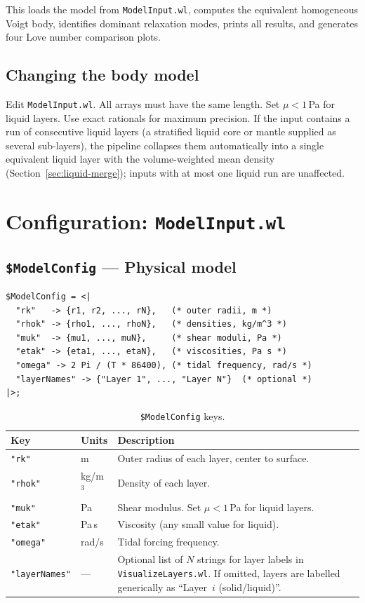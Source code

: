 \documentclass[11pt]{article}
\begin{document}
This loads the model from \texttt{ModelInput.wl}, computes the
equivalent homogeneous Voigt body, identifies dominant relaxation
modes, prints all results, and generates four Love number comparison
plots.

\subsection{Changing the body model}

Edit \texttt{ModelInput.wl}.  All arrays must have the same length.
Set $\mu < 1$\,Pa for liquid layers.  Use exact rationals for maximum
precision.  If the input contains a run of consecutive liquid
layers (a stratified liquid core or mantle supplied as several
sub-layers), the pipeline collapses them automatically into a
single equivalent liquid layer with the volume-weighted mean
density (Section~\ref{sec:liquid-merge}); inputs with at most one
liquid run are unaffected.

\section{Configuration: \texttt{ModelInput.wl}}
\label{sec:config}

\subsection{\texttt{\$ModelConfig} --- Physical model}

\begin{lstlisting}
$ModelConfig = <|
  "rk"   -> {r1, r2, ..., rN},   (* outer radii, m *)
  "rhok" -> {rho1, ..., rhoN},   (* densities, kg/m^3 *)
  "muk"  -> {mu1, ..., muN},     (* shear moduli, Pa *)
  "etak" -> {eta1, ..., etaN},   (* viscosities, Pa s *)
  "omega" -> 2 Pi / (T * 86400), (* tidal frequency, rad/s *)
  "layerNames" -> {"Layer 1", ..., "Layer N"}  (* optional *)
|>;
\end{lstlisting}

\begin{table}[h]
\centering
\begin{tabular}{@{}llp{7cm}@{}}
\toprule
\textbf{Key} & \textbf{Units} & \textbf{Description} \\
\midrule
\texttt{"rk"}    & m      & Outer radius of each layer, center to
  surface. \\
\texttt{"rhok"}  & kg/m$^3$ & Density of each layer. \\
\texttt{"muk"}   & Pa     & Shear modulus.  Set $\mu < 1$\,Pa for
  liquid layers. \\
\texttt{"etak"}  & Pa\,s  & Viscosity (any small value for liquid). \\
\texttt{"omega"} & rad/s  & Tidal forcing frequency. \\
\texttt{"layerNames"} & ---  & Optional list of $N$ strings for
  layer labels in \texttt{VisualizeLayers.wl}.  If omitted, layers are
  labelled generically as ``Layer~$i$ (solid/liquid)''. \\
\bottomrule
\end{tabular}
\caption{\texttt{\$ModelConfig} keys.}
\end{table}
\end{document}
